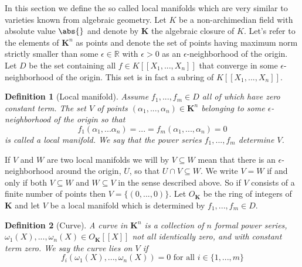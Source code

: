 \documentclass{article}
\newtheorem{definition}{Definition}[section]
\newcommand{\mbb}[1]{\mathbb{#1}}
\numberwithin{equation}{section}
\begin{document}
In this section we define the so called local manifolds which are very similar to varieties known from algebraic geometry. Let $K$ be a non-archimedian field with absolute value $\abs{}$ and denote by $\bm K$ the algebraic closure of $K$. Let's refer to the elements of $\bm K^n$ as points and denote the set of points having maximum norm strictly smaller than some $\epsilon \in \mbb R$ with $\epsilon > 0$ as an $\epsilon$-neighborhood of the origin. Let $D$ be the set containing all $f \in K[[X_1, ..., X_n]]$ that converge in some $\epsilon$-neighborhood of the origin. This set is in fact a subring of $K[[X_1, ..., X_n]]$.

\begin{definition}[Local manifold]
    Assume $f_1, ..., f_m \in D$ all of which have zero constant term. The set $V$ of points $(\alpha_1, ..., \alpha_n) \in \bm K^n$ belonging to some $\epsilon$-neighborhood of the origin so that $$f_1(\alpha_1, ... \alpha_n) = ... = f_m(\alpha_1, ..., \alpha_n) = 0$$
    is called a local manifold. We say that the power series $f_1, ..., f_m$ determine $V$.
\end{definition}
If $V$ and $W$ are two local manifolds we will by $V \subseteq W$ mean that there is an $\epsilon$-neighborhood around the origin, $U$, so that $U \cap V \subseteq W$. We write $V = W$ if and only if both $V \subseteq W$ and $W \subseteq V$ in the sense described above. So if $V$ consists of a finite number of points then $V = \{(0,...,0)\}$. Let $O_{\bm K}$ be the ring of integers of $\bm K$ and let $V$ be a local manifold which is determined by $f_1, ..., f_m \in D$.




\begin{definition}[Curve]
    A curve in $\bm{K}^n$ is a collection of $n$ formal power series, $\omega_1(X), ..., \omega_n(X) \in O_{\bm K}[[X]]$ not all identically zero, and with constant term zero. We say the curve lies on $V$ if $$f_i(\omega_1(X), ..., \omega_n(X)) = 0 \text{ for all } i \in \{1, ..., m \}$$
\end{definition}
\end{document}
